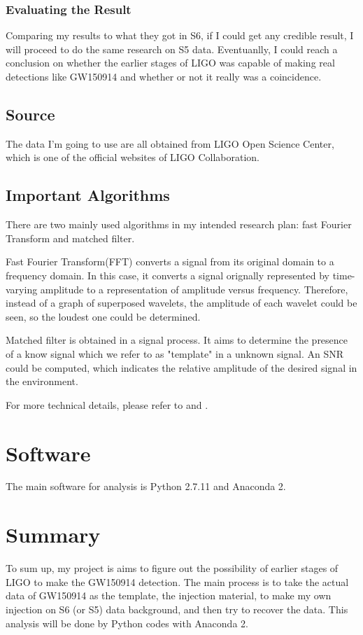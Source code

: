 \documentclass[aps,prl,preprint]{revtex4}
\begin{document}
\subsubsection{Evaluating the Result}
Comparing my results to what they got in S6\cite{S6himass}, if I could get any credible result, I will proceed to do the same research on S5 data. Eventuanlly, I could reach a conclusion on whether the earlier stages of LIGO was capable of making real detections like GW150914 and whether or not it really was a coincidence.

\subsection{Source}
The data I'm going to use are all obtained from LIGO Open Science Center\cite{LOSC}, which is one of the official websites of LIGO Collaboration.
\subsection{Important Algorithms}
There are two mainly used algorithms in my intended research plan: fast Fourier Transform and matched filter.
\par Fast Fourier Transform(FFT)\cite{FFT} converts a signal from its original domain to a frequency domain. In this case, it converts a signal orignally represented by time-varying amplitude to a representation of amplitude versus frequency. Therefore, instead of a graph of superposed wavelets, the amplitude of each wavelet could be seen, so the loudest one could be determined.
\par Matched filter\cite{MF} is obtained in a signal process. It aims to determine the presence of a know signal which we refer to as "template" in a unknown signal. An SNR could be computed, which indicates the relative amplitude of the desired signal in the environment.
\par For more technical details, please refer to \cite{FFT} and \cite{MF}.

\section{Software}
The main software for analysis is Python 2.7.11 and Anaconda 2.

\section{Summary}
To sum up, my project is aims to figure out the possibility of earlier stages of LIGO to make the GW150914 detection. The main process is to take the actual data of GW150914 as the template, the injection material, to make my own injection on S6 (or S5) data background, and then try to recover the data. This analysis will be done by Python codes with Anaconda 2.


\end{document}
